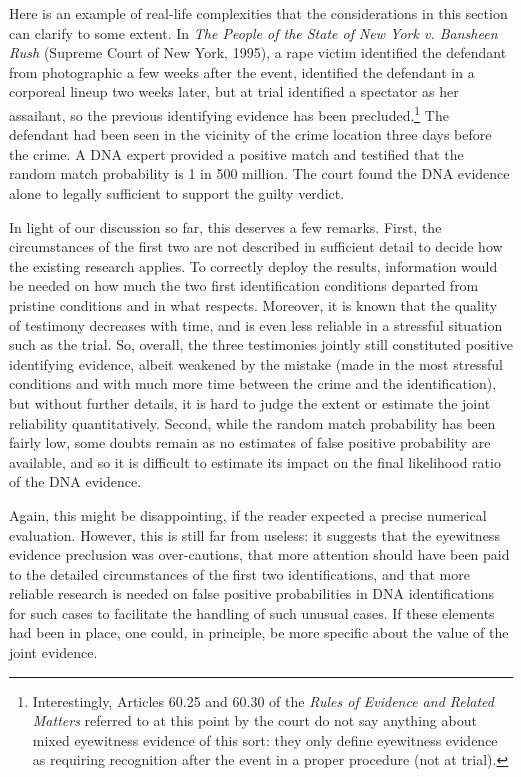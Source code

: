 \documentclass[
  10pt,
  dvipsnames,enabledeprecatedfontcommands]{scrartcl}
\begin{document}
Here is an example of real-life complexities that the considerations in
this section can clarify to some extent. In
\emph{The People of the State of New York v. Bansheen Rush} (Supreme
Court of New York, 1995), a rape victim identified the defendant from
photographic a few weeks after the event, identified the defendant in a
corporeal lineup two weeks later, but at trial identified a spectator as
her assailant, so the previous identifying evidence has been
precluded.\footnote{Interestingly, Articles 60.25 and 60.30 of the \emph{Rules of Evidence and Related Matters} referred to at this point by the court do not say anything about mixed eyewitness evidence of this sort: they only define eyewitness evidence as requiring recognition after the event in a proper  procedure (not at trial).}
The defendant had been seen in the vicinity of the crime location three
days before the crime. A DNA expert provided a positive match and
testified that the random match probability is 1 in 500 million. The
court found the DNA evidence alone to legally sufficient to support the
guilty verdict.

In light of our discussion so far, this deserves a few remarks. First,
the circumstances of the first two are not described in sufficient
detail to decide how the existing research applies. To correctly deploy
the results, information would be needed on how much the two first
identification conditions departed from pristine conditions and in what
respects. Moreover, it is known that the quality of testimony decreases
with time, and is even less reliable in a stressful situation such as
the trial. So, overall, the three testimonies jointly still constituted
positive identifying evidence, albeit weakened by the mistake (made in
the most stressful conditions and with much more time between the crime
and the identification), but without further details, it is hard to
judge the extent or estimate the joint reliability quantitatively.
Second, while the random match probability has been fairly low, some
doubts remain as no estimates of false positive probability are
available, and so it is difficult to estimate its impact on the final
likelihood ratio of the DNA evidence.

Again, this might be disappointing, if the reader expected a precise
numerical evaluation. However, this is still far from useless: it
suggests that the eyewitness evidence preclusion was over-cautions, that
more attention should have been paid to the detailed circumstances of
the first two identifications, and that more reliable research is needed
on false positive probabilities in DNA identifications for such cases to
facilitate the handling of such unusual cases. If these elements had
been in place, one could, in principle, be more specific about the value
of the joint evidence.
\end{document}
